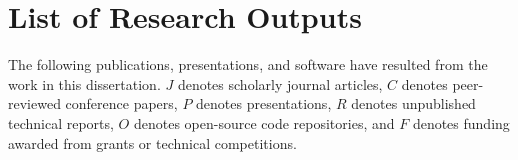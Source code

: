 \section{List of Research Outputs}\label{sec:research-outputs}
The following publications, presentations, and software have resulted from the work in this dissertation.
$J$ denotes scholarly journal articles, $C$ denotes peer-reviewed conference papers, $P$ denotes presentations, $R$ denotes unpublished technical reports, $O$ denotes open-source code repositories, and $F$ denotes funding awarded from grants or technical competitions.

\newenvironment{typedlist}
{\begin{list}{}{\leftmargin=2em}}
{\end{list}}

